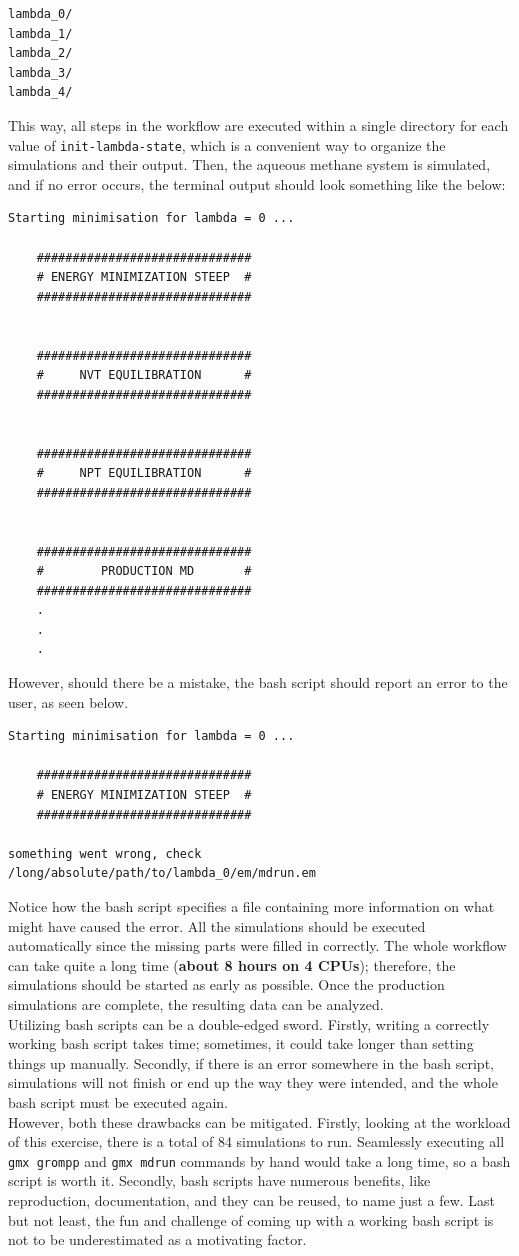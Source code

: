 \documentclass[9pt,tutorial]{livecoms}
\newcommand{\code}[1]{\colorbox{light-gray}{\texttt{#1}}}
\begin{document}
\begin{lstlisting}
lambda_0/
lambda_1/
lambda_2/
lambda_3/
lambda_4/
\end{lstlisting}
This way, all steps in the workflow are executed within a single directory for each value of \texttt{init-lambda-state}, which is a convenient way to organize the simulations and their output. Then, the aqueous methane system is simulated, and if no error occurs, the terminal output should look something like the below:
\begin{lstlisting}
Starting minimisation for lambda = 0 ...

    ##############################
    # ENERGY MINIMIZATION STEEP  #
    ##############################


    ##############################
    #     NVT EQUILIBRATION      #
    ##############################


    ##############################
    #     NPT EQUILIBRATION      #
    ##############################


    ##############################
    #        PRODUCTION MD       #
    ##############################
    .
    .
    .
\end{lstlisting}
However, should there be a mistake, the bash script should report an error to the user, as seen below.
\begin{lstlisting}
Starting minimisation for lambda = 0 ...

    ##############################
    # ENERGY MINIMIZATION STEEP  #
    ##############################

something went wrong, check /long/absolute/path/to/lambda_0/em/mdrun.em
\end{lstlisting}
Notice how the bash script specifies a file containing more information on what might have caused the error. All the simulations should be executed automatically since the missing parts were filled in correctly. The whole workflow can take quite a long time (\textbf{about 8 hours on 4 CPUs}); therefore, the simulations should be started as early as possible. Once the production simulations are complete, the resulting data can be analyzed.\\
Utilizing bash scripts can be a double-edged sword. Firstly, writing a correctly working bash script takes time; sometimes, it could take longer than setting things up manually. Secondly, if there is an error somewhere in the bash script, simulations will not finish or end up the way they were intended, and the whole bash script must be executed again.\\
However, both these drawbacks can be mitigated. Firstly, looking at the workload of this exercise, there is a total of 84 simulations to run. Seamlessly executing all \code{gmx grompp} and \code{gmx mdrun} commands by hand would take a long time, so a bash script is worth it. Secondly, bash scripts have numerous benefits, like reproduction, documentation, and they can be reused, to name just a few. Last but not least, the fun and challenge of coming up with a working bash script is not to be underestimated as a motivating factor.\\
\end{document}

